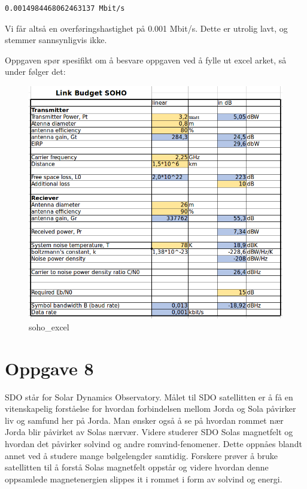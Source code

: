 \documentclass[11pt]{article}
\makeatletter
\def\maxwidth{\ifdim\Gin@nat@width>\linewidth\linewidth
    \else\Gin@nat@width\fi}
\let\Oldincludegraphics\includegraphics
\renewcommand{\includegraphics}[1]{\Oldincludegraphics[width=.8\maxwidth]{#1}}
\makeatother
\begin{document}
    \begin{Verbatim}[commandchars=\\\{\}]
0.0014984468062463137 Mbit/s

    \end{Verbatim}

    Vi får altså en overføringshastighet på 0.001 Mbit/s. Dette er utrolig
lavt, og stemmer sannsynligvis ikke.

    Oppgaven spør spesifikt om å besvare oppgaven ved å fylle ut excel
arket, så under følger det:

    \begin{figure}[htbp]
\centering
\includegraphics{img/space_tech/soho_excel.png}
\caption{soho\_excel}
\end{figure}

    \section{Oppgave 8}\label{oppgave-8}

    SDO står for Solar Dynamics Observatory. Målet til SDO satellitten er å
få en vitenskapelig forståelse for hvordan forbindelsen mellom Jorda og
Sola påvirker liv og samfund her på Jorda. Man ønsker også å se på
hvordan rommet nær Jorda blir påvirket av Solas nærvær. Videre studerer
SDO Solas magnetfelt og hvordan det påvirker solvind og andre
romvind-fenomener. Dette oppnåes blandt annet ved å studere mange
bølgelengder samtidig. Forskere prøver å bruke satellitten til å forstå
Solas magnetfelt oppstår og videre hvordan denne oppsamlede
magnetenergien slippes it i rommet i form av solvind og energi.
\end{document}
